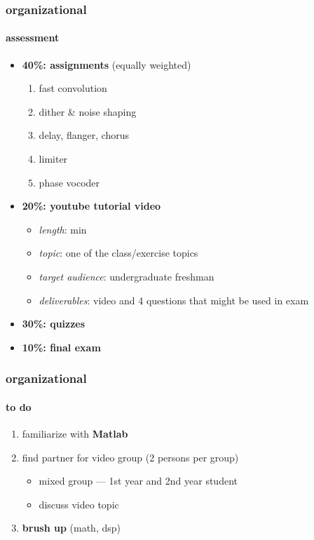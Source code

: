     \begin{frame}\frametitle{organizational}\framesubtitle{assessment}
        \begin{itemize}
            \item	\textbf{40\%: assignments} (equally weighted)
                    \begin{enumerate}
                        \item	fast convolution
                        \item   dither \& noise shaping
                        \item   delay, flanger, chorus
                        \item   limiter
                        \item   phase vocoder
                    \end{enumerate}
            \pause
            \smallskip
            \item   \textbf{20\%: youtube tutorial video}
                    \begin{itemize}
                        \item   \textit{length}: \unit[3]{min}
                        \item   \textit{topic}: one of the class/exercise topics
                        \item   \textit{target audience}: undergraduate freshman
                        \item   \textit{deliverables}: video and 4 questions that might be used in  exam
                    \end{itemize}
            \pause
            \smallskip
            \item   \textbf{30\%: quizzes}
            \smallskip
            \item   \textbf{10\%: final exam}
       \end{itemize}
    \end{frame}

\begin{frame}\frametitle{organizational}\framesubtitle{to do}
    \begin{enumerate}
        \item   familiarize with \textbf{Matlab}
        \pause
        \bigskip
        \item   find partner for video group (2 persons per group)
            \begin{itemize}
                \item   mixed group --- 1st year and 2nd year student
                \item   discuss video topic
            \end{itemize}
        \pause
        \bigskip
        \item  \textbf{ brush up} (math, dsp)
    \end{enumerate}
\end{frame}



